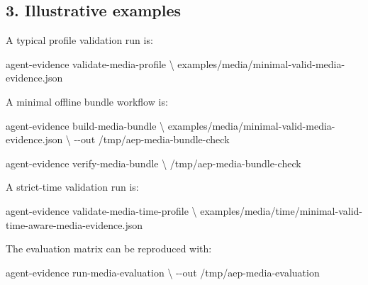\documentclass[
]{article}
\newenvironment{Shaded}{}{}
\newcommand{\AttributeTok}[1]{\textcolor[rgb]{0.49,0.56,0.16}{#1}}
\newcommand{\DataTypeTok}[1]{\textcolor[rgb]{0.56,0.13,0.00}{#1}}
\newcommand{\ExtensionTok}[1]{#1}
\newcommand{\NormalTok}[1]{#1}
\begin{document}
\subsection{3. Illustrative examples}\label{illustrative-examples}

A typical profile validation run is:

\begin{Shaded}
\begin{Highlighting}[]
\ExtensionTok{agent{-}evidence}\NormalTok{ validate{-}media{-}profile }\DataTypeTok{\textbackslash{}}
\NormalTok{  examples/media/minimal{-}valid{-}media{-}evidence.json}
\end{Highlighting}
\end{Shaded}

A minimal offline bundle workflow is:

\begin{Shaded}
\begin{Highlighting}[]
\ExtensionTok{agent{-}evidence}\NormalTok{ build{-}media{-}bundle }\DataTypeTok{\textbackslash{}}
\NormalTok{  examples/media/minimal{-}valid{-}media{-}evidence.json }\DataTypeTok{\textbackslash{}}
  \AttributeTok{{-}{-}out}\NormalTok{ /tmp/aep{-}media{-}bundle{-}check}

\ExtensionTok{agent{-}evidence}\NormalTok{ verify{-}media{-}bundle }\DataTypeTok{\textbackslash{}}
\NormalTok{  /tmp/aep{-}media{-}bundle{-}check}
\end{Highlighting}
\end{Shaded}

A strict-time validation run is:

\begin{Shaded}
\begin{Highlighting}[]
\ExtensionTok{agent{-}evidence}\NormalTok{ validate{-}media{-}time{-}profile }\DataTypeTok{\textbackslash{}}
\NormalTok{  examples/media/time/minimal{-}valid{-}time{-}aware{-}media{-}evidence.json}
\end{Highlighting}
\end{Shaded}

The evaluation matrix can be reproduced with:

\begin{Shaded}
\begin{Highlighting}[]
\ExtensionTok{agent{-}evidence}\NormalTok{ run{-}media{-}evaluation }\DataTypeTok{\textbackslash{}}
  \AttributeTok{{-}{-}out}\NormalTok{ /tmp/aep{-}media{-}evaluation}
\end{Highlighting}
\end{Shaded}
\end{document}

